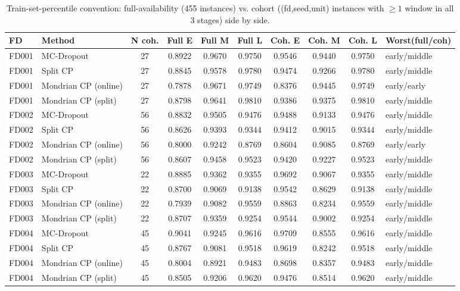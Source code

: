 \begin{table}[t]
\caption{Train-set-percentile convention: full-availability (455 instances) vs. cohort ((fd,seed,unit) instances with $\geq 1$ window in all 3 stages) side by side.}
\label{tab:trainpct-full-vs-cohort}
\centering
\small
\begin{tabular}{llccccccc}
\toprule
FD & Method & N coh. & Full E & Full M & Full L & Coh. E & Coh. M & Coh. L & Worst(full/coh) \\
\midrule
FD001 & MC-Dropout & 27 & 0.8922 & 0.9670 & 0.9750 & 0.9546 & 0.9440 & 0.9750 & early/middle \\
FD001 & Split CP & 27 & 0.8845 & 0.9578 & 0.9780 & 0.9474 & 0.9266 & 0.9780 & early/middle \\
FD001 & Mondrian CP (online) & 27 & 0.7878 & 0.9671 & 0.9749 & 0.8376 & 0.9445 & 0.9749 & early/early \\
FD001 & Mondrian CP (split) & 27 & 0.8798 & 0.9641 & 0.9810 & 0.9386 & 0.9375 & 0.9810 & early/middle \\
FD002 & MC-Dropout & 56 & 0.8832 & 0.9505 & 0.9476 & 0.9488 & 0.9133 & 0.9476 & early/middle \\
FD002 & Split CP & 56 & 0.8626 & 0.9393 & 0.9344 & 0.9412 & 0.9015 & 0.9344 & early/middle \\
FD002 & Mondrian CP (online) & 56 & 0.8000 & 0.9242 & 0.8769 & 0.8604 & 0.9085 & 0.8769 & early/early \\
FD002 & Mondrian CP (split) & 56 & 0.8607 & 0.9458 & 0.9523 & 0.9420 & 0.9227 & 0.9523 & early/middle \\
FD003 & MC-Dropout & 22 & 0.8885 & 0.9362 & 0.9355 & 0.9692 & 0.9067 & 0.9355 & early/middle \\
FD003 & Split CP & 22 & 0.8700 & 0.9069 & 0.9138 & 0.9542 & 0.8629 & 0.9138 & early/middle \\
FD003 & Mondrian CP (online) & 22 & 0.7939 & 0.9082 & 0.9559 & 0.8863 & 0.8234 & 0.9559 & early/middle \\
FD003 & Mondrian CP (split) & 22 & 0.8707 & 0.9359 & 0.9254 & 0.9544 & 0.9002 & 0.9254 & early/middle \\
FD004 & MC-Dropout & 45 & 0.9041 & 0.9245 & 0.9616 & 0.9709 & 0.8555 & 0.9616 & early/middle \\
FD004 & Split CP & 45 & 0.8767 & 0.9081 & 0.9518 & 0.9619 & 0.8242 & 0.9518 & early/middle \\
FD004 & Mondrian CP (online) & 45 & 0.8004 & 0.8921 & 0.9483 & 0.8698 & 0.8357 & 0.9483 & early/middle \\
FD004 & Mondrian CP (split) & 45 & 0.8505 & 0.9206 & 0.9620 & 0.9476 & 0.8514 & 0.9620 & early/middle \\
\bottomrule
\end{tabular}
\end{table}
